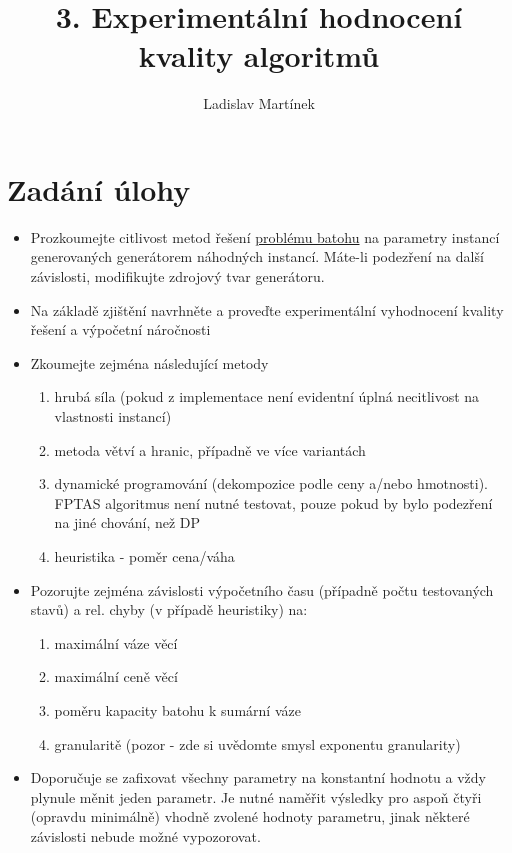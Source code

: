 \documentclass[11pt]{article}
\begin{document}

\title{3. Experimentální hodnocení kvality algoritmů}
\author{Ladislav Martínek}
\date{}
\maketitle
 
\section{Zadání úlohy} 

\begin{itemize}
\item Prozkoumejte citlivost metod řešení \href{http://www.csc.kth.se/~viggo/wwwcompendium/node211.html#7374}{problému batohu} na parametry instancí generovaných generátorem náhodných instancí. Máte-li podezření na další závislosti, modifikujte zdrojový tvar generátoru.
\item Na základě zjištění navrhněte a proveďte experimentální vyhodnocení kvality řešení a výpočetní náročnosti
\item Zkoumejte zejména následující metody
\begin{enumerate}
\item hrubá síla (pokud z implementace není evidentní úplná necitlivost na vlastnosti instancí)
\item metoda větví a hranic, případně ve více variantách
\item dynamické programování (dekompozice podle ceny a/nebo hmotnosti). FPTAS algoritmus není nutné testovat, pouze pokud by bylo podezření na jiné chování, než DP
\item heuristika - poměr cena/váha
\end{enumerate}
\item Pozorujte zejména závislosti výpočetního času (případně počtu testovaných stavů) a rel. chyby (v případě heuristiky) na:
\begin{enumerate}
\item maximální váze věcí
\item maximální ceně věcí
\item poměru kapacity batohu k sumární váze
\item granularitě (pozor - zde si uvědomte smysl exponentu granularity)
\end{enumerate}
\item Doporučuje se zafixovat všechny parametry na konstantní hodnotu a vždy plynule měnit jeden parametr. Je nutné naměřit výsledky pro aspoň čtyři (opravdu minimálně) vhodně zvolené hodnoty parametru, jinak některé závislosti nebude možné vypozorovat.
\end{itemize}
\end{document}
